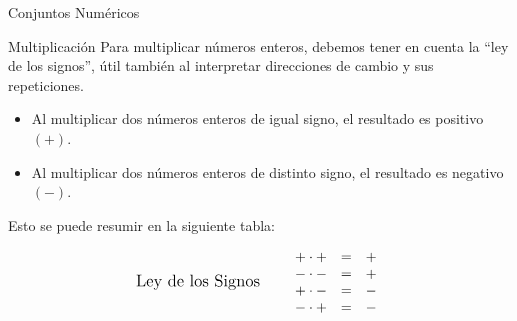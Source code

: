 \documentclass[aspectratio=169,handout,11pt]{beamer}
\begin{document}
	\begin{frame}{Conjuntos Numéricos}
		\begin{block}{Multiplicación}
			Para multiplicar números enteros, debemos tener en cuenta la ``ley de los signos'', útil también al interpretar direcciones de cambio y sus repeticiones.
			
			\pause
			
			\begin{itemize}
				\item Al multiplicar dos números enteros de igual signo, el resultado es positivo $(+)$.
				\pause
				\item Al multiplicar dos números enteros de distinto signo, el resultado es negativo $(-)$.
				\pause
			\end{itemize}
			
			Esto se puede resumir en la siguiente tabla:
			\pause
			
			\[
			\text{\large Ley de los Signos}
			\qquad
			\begin{array}{ccc}
				+\cdot + & = & + \\
				-\cdot - & = & + \\
				+\cdot - & = & - \\
				-\cdot + & = & -
			\end{array}
			\]
		\end{block}
	\end{frame}
	
\end{document}
